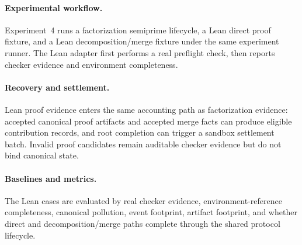 \documentclass{article}
\theoremstyle{plain}
\begin{document}
{\paragraph{Experimental workflow.}
{\color{blue}
Experiment~4 runs a factorization semiprime lifecycle, a Lean direct proof fixture, and a Lean decomposition/merge fixture under the same experiment runner. The Lean adapter first performs a real preflight check, then reports checker evidence and environment completeness.
}


\paragraph{Recovery and settlement.}
{\color{blue}
Lean proof evidence enters the same accounting path as factorization evidence: accepted canonical proof artifacts and accepted merge facts can produce eligible contribution records, and root completion can trigger a sandbox settlement batch. Invalid proof candidates remain auditable checker evidence but do not bind canonical state.
}

\paragraph{Baselines and metrics.}
{\color{blue}
The Lean cases are evaluated by real checker evidence, environment-reference completeness, canonical pollution, event footprint, artifact footprint, and whether direct and decomposition/merge paths complete through the shared protocol lifecycle.
}



}
\begingroup
\color{blue}
\small
\renewcommand{\arraystretch}{1.12}
\providecommand{\FloatBarrier}{}
\providecommand{\TS}{TokenShare}
\providecommand{\tickyes}{\(\checkmark\)}
\providecommand{\tickno}{--}


\makeatletter
\let\TSoldmakecaption\@makecaption
\renewcommand{\@makecaption}[2]{%
  \vskip\abovecaptionskip
  \sbox\@tempboxa{{\color{blue}\small #1: #2}}%
  \ifdim \wd\@tempboxa >\hsize
    {\color{blue}\small #1: #2\par}%
  \else
    \global\@minipagefalse
    \hb@xt@\hsize{\hfil\box\@tempboxa\hfil}%
  \fi
  \vskip\belowcaptionskip}
\makeatother
\end{document}
